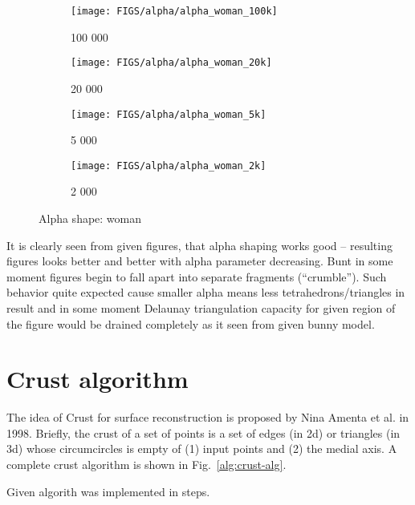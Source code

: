 \documentclass[11pt]{article}
\begin{document}
\begin{figure}[h]
    \begin{subfigure}{.22\textwidth}
        \centering
        \texttt{[image: FIGS/alpha/alpha\_woman\_100k]}
        \caption{100 000}
    \end{subfigure}
    \begin{subfigure}{.22\textwidth}
        \centering
        \texttt{[image: FIGS/alpha/alpha\_woman\_20k]}
        \caption{20 000}
    \end{subfigure}
    \begin{subfigure}{.22\textwidth}
        \centering
        \texttt{[image: FIGS/alpha/alpha\_woman\_5k]}
        \caption{5 000}
    \end{subfigure}
    \begin{subfigure}{.22\textwidth}
        \centering
        \texttt{[image: FIGS/alpha/alpha\_woman\_2k]}
        \caption{2 000}
    \end{subfigure}
    \caption{Alpha shape: woman}
    \label{fig:alpha_woman}
\end{figure}


It is clearly seen from given figures, that alpha shaping works good – resulting figures looks better and better with alpha parameter decreasing. Bunt in some moment figures begin to fall apart into separate fragments (“crumble”). Such behavior quite expected cause smaller alpha means less tetrahedrons/triangles in result and in some moment Delaunay triangulation capacity for given region of the figure would be drained completely as it seen from given bunny model.

\section{Crust algorithm}
The idea of Crust for surface reconstruction is proposed by Nina Amenta et al. \cite{abk-anvra-98} in 1998.
Briefly, the crust of a set of points is a set of edges (in 2d) or triangles (in 3d) whose circumcircles is empty of
(1) input points and (2) the medial axis.  A complete crust algorithm is shown in Fig.~\ref{alg:crust-alg}.

Given algorith was implemented in steps.
\end{document}
